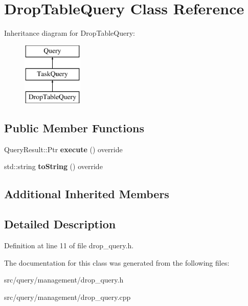 \hypertarget{class_drop_table_query}{}\section{Drop\+Table\+Query Class Reference}
\label{class_drop_table_query}
Inheritance diagram for Drop\+Table\+Query\+:\begin{figure}[H]
\begin{center}
\leavevmode
\includegraphics[height=3.000000cm]{class_drop_table_query}
\end{center}
\end{figure}
\subsection*{Public Member Functions}
\begin{DoxyCompactItemize}
\item 
\mbox{\label{class_drop_table_query_a09612e6e0f58bc03fa664a67fe92be8f}} 
Query\+Result\+::\+Ptr {\bfseries execute} () override
\item 
\mbox{\label{class_drop_table_query_a30eb39edc286cdd15bed4fc791f76d38}} 
std\+::string {\bfseries to\+String} () override
\end{DoxyCompactItemize}
\subsection*{Additional Inherited Members}


\subsection{Detailed Description}


Definition at line 11 of file drop\+\_\+query.\+h.



The documentation for this class was generated from the following files\+:\begin{DoxyCompactItemize}
\item 
src/query/management/drop\+\_\+query.\+h\item 
src/query/management/drop\+\_\+query.\+cpp\end{DoxyCompactItemize}
